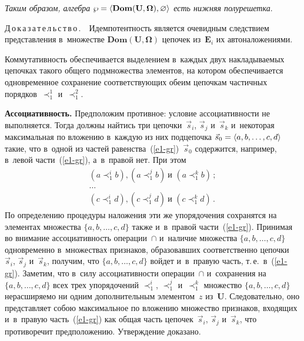 \begin{multicols}{2}
\textit{Таким образом, алгебра $\wp \hm= \langle 
\mathbf{Dom}(\mathbf{U},\boldsymbol{\Omega}), \varnothing\rangle$ есть 
нижняя полурешетка}.
  
  \noindent
  Д\,о\,к\,а\,з\,а\,т\,е\,л\,ь\,с\,т\,в\,о\,.\ \ Идемпотентность является очевидным 
след\-ст\-ви\-ем пред\-став\-ле\-ния в~множестве 
$\mathbf{Dom}(\mathbf{U},\boldsymbol{\Omega})$ цепочек из~$\mathbf{E}_i$ их 
автоналожениями.
  
   Коммутативность обеспечивается выделением в~каждых двух на\-кла\-ды\-ва\-емых 
цепочках такого общего подмножества элементов, на котором обеспечивается 
одновременное сохранение со\-от\-вет\-ст\-ву\-ющих обеим цепочкам час\-тич\-ных 
порядков~$\prec_1^1$ и~$\prec_1^2$.
  
\textbf{Ассоциативность.} Предположим противное: условие ассоциативности не 
выполняется. Тогда должны найтись три цепочки~$\vec{s}_i$, $\vec{s}_j$ 
и~$\vec{s}_k$ и~некоторая максимальная по вложению в~каж\-дую из них 
подцепочка $\vec{s}_0\hm=\langle a, b, \ldots , c, d\rangle$ такие, что в~одной из 
час\-тей равенства~(\ref{e1-gr})~$\vec{s}_0$ содержится, например, в~левой  
час\-ти~(\ref{e1-gr}), а~в~правой нет. При этом
  \begin{gather*}
(a \prec_1^i b), (a \prec_1^j b)\ \mbox{и } (a \prec_1^k b)\,;\\
\ldots\\
(c \prec_1^i d), (c \prec_1^j d)\ \mbox{и } (c \prec_1^k d)\,.
\end{gather*}
По определению процедуры наложения эти же упорядочения сохранятся на 
элементах множества $\{a, b, \ldots, c, d\}$ также и~в~правой час\-ти~(\ref{e1-gr}). 
Принимая во внимание ассоциативность операции~$\cap$ и~наличие множества 
$\{a, b, \ldots, c, d\}$ одновременно в~множествах признаков, обра\-зо\-вав\-ших 
соответственно цепочки~$\vec{s}_i$, $\vec{s}_j$ и~$\vec{s}_k$, получим, что 
$\{a, b, \ldots, c, d\}$ войдет и~в~правую часть, т.\,е.\ в~(\ref{e1-gr}). Заметим, 
что в~силу ассоциативности операции~$\cap$ и~сохранения на $\{a, b, \ldots, c, 
d\}$ всех трех упорядочений $\prec_1^i$, $\prec_1^j$ и~$\prec_1^k$ множество 
$\{a, b, \ldots, c, d\}$ нерасширяемо ни одним дополнительным элементом~$z$ 
из~$\mathbf{U}$. Следовательно, оно представляет собою максимальное по 
вложению мно\-же\-ст\-во признаков, входящих и~в~правую часть~(\ref{e1-gr}) как 
общая часть цепочек~$\vec{s}_i$, $\vec{s}_j$ и~$\vec{s}_k$, что противоречит 
предположению. Утверждение доказано.
  
  \smallskip
  

\end{multicols}
